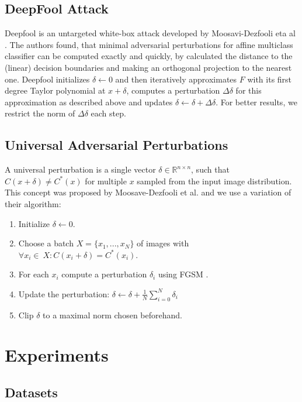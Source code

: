 \documentclass{article}
\begin{document}
\subsection{DeepFool Attack}
Deepfool is an untargeted white-box attack developed by Moosavi-Dezfooli eta al \cite{deepfool}.
The authors found, that minimal adversarial perturbations for affine multiclass classifier can be computed exactly and quickly,
by calculated the distance to the (linear) decision boundaries and making an orthogonal projection to the nearest one.
Deepfool initializes $\delta \gets 0$ and then iteratively approximates $F$ with its first degree Taylor polynomial at $x + \delta$, computes a perturbation $\Delta \delta$ for this approximation as described above and updates $\delta \gets \delta + \Delta \delta$.
For better results, we restrict the norm of $\Delta \delta$ each step.

\subsection{Universal Adversarial Perturbations}
A universal perturbation is a single vector $\delta \in \mathbb{R}^{n\times n}$, such that $C(x + \delta) \neq C^*(x)$ for multiple $x$ sampled from the input image distribution. This concept was proposed by Moosave-Dezfooli et al. \cite{universal} and we use a variation of their algorithm:
\begin{enumerate}
	\item Initialize $\delta \gets 0$.
	\item Choose a batch $X = \{x_1, ..., x_N\}$ of images with $\forall x_i \in\ X:  C(x_i + \delta) = C^*(x_i)$.
	\item For each $x_i$ compute a perturbation $\delta_i$ using FGSM \cite{fgsm}.
	\item Update the perturbation: $\delta \gets \delta + \frac{1}{N} \sum\limits_{i=0}^N \delta_i$
	\item Clip $\delta$ to a maximal norm chosen beforehand.
\end{enumerate}


\section{Experiments}
\label{lab:experiments}

\subsection{Datasets}
\end{document}
